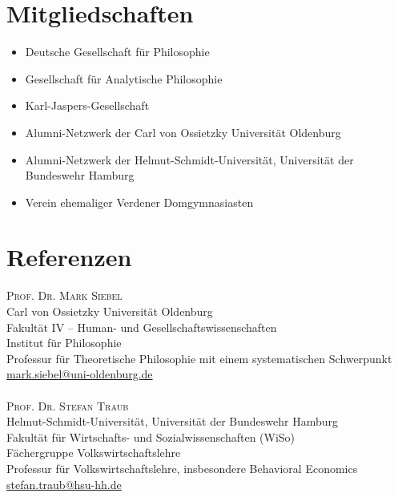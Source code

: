 \documentclass[a4paper,10pt]{article}
\begin{document}
\section{Mitgliedschaften}
\begin{itemize}
   \item Deutsche Gesellschaft für Philosophie
   \item Gesellschaft für Analytische Philosophie
   \item Karl-Jaspers-Gesellschaft
   \item Alumni-Netzwerk der Carl von Ossietzky Universität Oldenburg
   \item Alumni-Netzwerk der Helmut-Schmidt-Universität, Universität der Bundeswehr Hamburg
   \item Verein ehemaliger Verdener Domgymnasiasten
\end{itemize}


\clearpage
\section{Referenzen}
\textsc{Prof. Dr. Mark Siebel}\\
Carl von Ossietzky Universität Oldenburg\\
Fakultät IV -- Human- und Gesellschaftswissenschaften\\
Institut für Philosophie\\
Professur für Theoretische Philosophie mit einem systematischen Schwerpunkt\\
\href{mailto:mark.siebel@uni-oldenburg.de}{mark.siebel@uni-oldenburg.de}\\
\\
\textsc{Prof. Dr. Stefan Traub}\\
Helmut-Schmidt-Universität, Universität der Bundeswehr Hamburg\\
Fakultät für Wirtschafts- und Sozialwissenschaften (WiSo)\\
Fächergruppe Volkswirtschaftslehre\\
Professur für Volkswirtschaftslehre, insbesondere Behavioral Economics\\
\href{mailto:stefan.traub@hsu-hh.de}{stefan.traub@hsu-hh.de}\\
\end{document}
